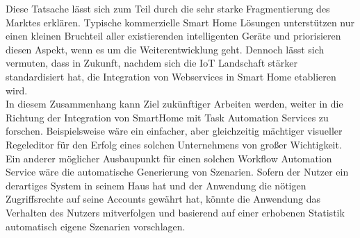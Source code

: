 Diese Tatsache lässt sich zum Teil durch die sehr starke Fragmentierung des Marktes erklären. Typische kommerzielle Smart Home Lösungen unterstützen nur einen kleinen Bruchteil aller existierenden intelligenten Geräte und priorisieren diesen Aspekt, wenn es um die Weiterentwicklung geht. Dennoch lässt sich vermuten, dass in Zukunft, nachdem sich die IoT Landschaft stärker standardisiert hat, die Integration von Webservices in Smart Home etablieren wird.\\

In diesem Zusammenhang kann Ziel zukünftiger Arbeiten werden, weiter in die Richtung der Integration von SmartHome mit Task Automation Services zu forschen. Beispielsweise wäre ein einfacher, aber gleichzeitig mächtiger visueller Regeleditor für den Erfolg eines solchen Unternehmens von großer Wichtigkeit. \\

Ein anderer möglicher Ausbaupunkt für einen solchen Workflow Automation Service wäre die automatische Generierung von Szenarien. Sofern der Nutzer ein derartiges System in seinem Haus hat und der Anwendung die nötigen Zugriffsrechte auf seine Accounts gewährt hat, könnte die Anwendung das Verhalten des Nutzers mitverfolgen und basierend auf einer erhobenen Statistik automatisch eigene Szenarien vorschlagen.